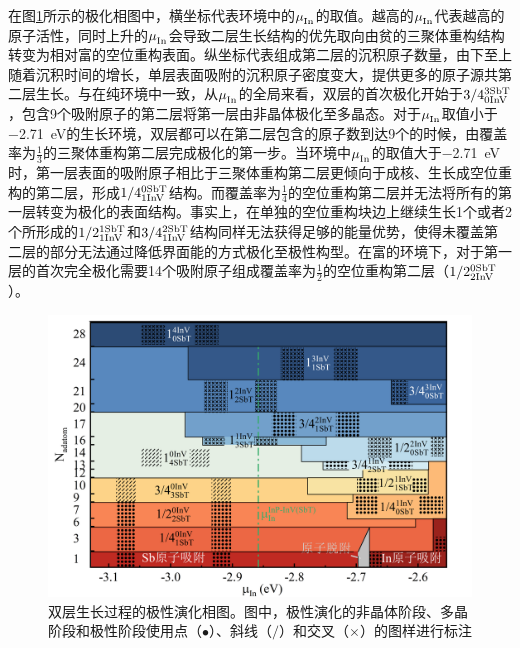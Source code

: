 在图\ref{fig:IS_DFT_2LInSb_partPhase}所示的极化相图中，横坐标代表环境中的$\it \mu_{\rm In}^{\rm } \it$的取值。越高的$\it \mu_{\rm In}^{\rm } \it$代表越高的原子活性，同时上升的$\it \mu_{\rm In}^{\rm } \it$会导致二层生长结构的优先取向由贫的三聚体重构结构转变为相对富的空位重构表面。纵坐标代表组成第二层的沉积原子数量，由下至上随着沉积时间的增长，单层表面吸附的沉积原子密度变大，提供更多的原子源共第二层生长。与在纯环境中一致，从$\it \mu_{\rm In}^{\rm } \it$的全局来看，双层的首次极化开始于$\rm 3/4{}_{0InV}^{3SbT} \it$，包含9个吸附原子的第二层将第一层由非晶体极化至多晶态。对于$\it \mu_{\rm In}^{\rm } \it$取值小于\SI{-2.71}{\electronvolt}的生长环境，双层都可以在第二层包含的原子数到达9个的时候，由覆盖率为$\frac{1}{3}$的三聚体重构第二层完成极化的第一步。当环境中$\it \mu_{\rm In}^{\rm } \it$的取值大于\SI{-2.71}{\electronvolt}时，第一层表面的吸附原子相比于三聚体重构第二层更倾向于成核、生长成空位重构的第二层，形成$\rm 1/4{}_{1InV}^{0SbT} \it$结构。而覆盖率为$\frac{1}{4}$的空位重构第二层并无法将所有的第一层转变为极化的表面结构。事实上，在单独的空位重构块边上继续生长1个或者2个所形成的$\rm 1/2{}_{1InV}^{1SbT} \it$和$\rm 3/4{}_{1InV}^{2SbT} \it$结构同样无法获得足够的能量优势，使得未覆盖第二层的部分无法通过降低界面能的方式极化至极性构型。在富的环境下，对于第一层的首次完全极化需要14个吸附原子组成覆盖率为$\frac{1}{2}$的空位重构第二层（$\rm 1/2{}_{2InV}^{0SbT} \it$）。

\begin{figure}[htb]
    \includegraphics{pic/IS_DFT_2LInSb_partPhase.png}
    \caption{双层生长过程的极性演化相图。图中，极性演化的非晶体阶段、多晶阶段和极性阶段使用点（$\bullet$）、斜线（$/ $）和交叉（$\times$）的图样进行标注}
    \label{fig:IS_DFT_2LInSb_partPhase}
\end{figure}

